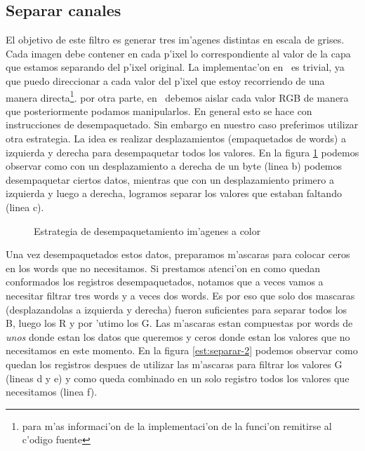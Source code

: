 \subsection{Separar canales}
El objetivo de este filtro es generar tres im'agenes distintas en escala de grises. Cada imagen debe contener en cada p'ixel lo correspondiente al valor de la capa que estamos separando del p'ixel original. La implementac'on en \C\ es trivial, ya que puedo direccionar a cada valor del p'ixel que estoy recorriendo de una manera directa\footnote{para m'as informaci'on de la implementaci'on de la funci'on remitirse al c'odigo fuente}. por otra parte, en \ass\ debemos aislar cada valor RGB de manera que posteriormente podamos manipularlos. En general esto se hace con instrucciones de desempaquetado. Sin embargo en nuestro caso preferimos utilizar otra estrategia. La idea es realizar desplazamientos (empaquetados de words) a izquierda y derecha para desempaquetar todos los valores. En la figura \ref{est:separar-1} podemos observar como con un desplazamiento a derecha de un byte (linea b) podemos desempaquetar ciertos datos, mientras que con un desplazamiento primero a izquierda y luego a derecha, logramos separar los valores que estaban faltando (linea c).

\begin{figure}[ht]
\caption{Estrategia de desempaquetamiento im'agenes a color}
\label{est:separar-1}
\end{figure}

Una vez desempaquetados estos datos, preparamos m'ascaras para colocar ceros en los words que no necesitamos. Si prestamos atenci'on en como quedan conformados los registros desempaquetados, notamos que a veces vamos a necesitar filtrar tres words y a veces dos words. Es por eso que solo dos mascaras (desplazandolas a izquierda y derecha) fueron suficientes para separar todos los B, luego los R y por 'utimo los G. Las m'ascaras estan compuestas por words de \textit{unos} donde estan los datos que queremos y ceros donde estan los valores que no necesitamos en este momento. En la figura \ref{est:separar-2} podemos observar como quedan los registros despues de utilizar las m'ascaras para filtrar los valores G (lineas d y e) y como queda combinado en un solo registro todos los valores que necesitamos (linea f).

